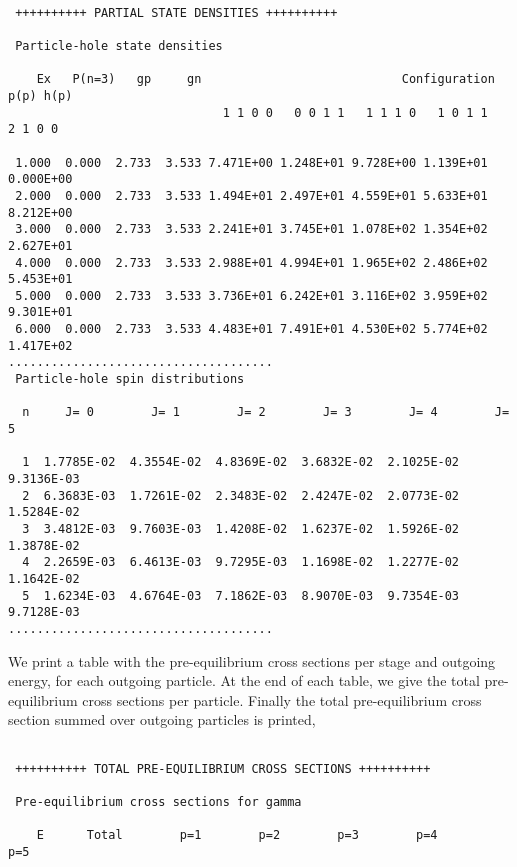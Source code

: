 \begin{samplecase}
{\small \begin{verbatim}

 ++++++++++ PARTIAL STATE DENSITIES ++++++++++

 Particle-hole state densities

    Ex   P(n=3)   gp     gn                            Configuration p(p) h(p) 
                              1 1 0 0   0 0 1 1   1 1 1 0   1 0 1 1   2 1 0 0  

 1.000  0.000  2.733  3.533 7.471E+00 1.248E+01 9.728E+00 1.139E+01 0.000E+00 
 2.000  0.000  2.733  3.533 1.494E+01 2.497E+01 4.559E+01 5.633E+01 8.212E+00 
 3.000  0.000  2.733  3.533 2.241E+01 3.745E+01 1.078E+02 1.354E+02 2.627E+01 
 4.000  0.000  2.733  3.533 2.988E+01 4.994E+01 1.965E+02 2.486E+02 5.453E+01 
 5.000  0.000  2.733  3.533 3.736E+01 6.242E+01 3.116E+02 3.959E+02 9.301E+01 
 6.000  0.000  2.733  3.533 4.483E+01 7.491E+01 4.530E+02 5.774E+02 1.417E+02 
.....................................
 Particle-hole spin distributions

  n     J= 0        J= 1        J= 2        J= 3        J= 4        J= 5       
 
  1  1.7785E-02  4.3554E-02  4.8369E-02  3.6832E-02  2.1025E-02  9.3136E-03  
  2  6.3683E-03  1.7261E-02  2.3483E-02  2.4247E-02  2.0773E-02  1.5284E-02  
  3  3.4812E-03  9.7603E-03  1.4208E-02  1.6237E-02  1.5926E-02  1.3878E-02  
  4  2.2659E-03  6.4613E-03  9.7295E-03  1.1698E-02  1.2277E-02  1.1642E-02  
  5  1.6234E-03  4.6764E-03  7.1862E-03  8.9070E-03  9.7354E-03  9.7128E-03  
.....................................
\end{verbatim} } \renewcommand{\baselinestretch}{1.07}\small\normalsize
\noindent
We print a table with the pre-equilibrium cross sections per stage and outgoing 
energy, for each outgoing particle. At the end of each table, we give the total
pre-equilibrium cross sections per particle. Finally the total pre-equilibrium 
cross section summed over outgoing particles is printed,

{\small \begin{verbatim}

 ++++++++++ TOTAL PRE-EQUILIBRIUM CROSS SECTIONS ++++++++++
  
 Pre-equilibrium cross sections for gamma
  
    E      Total        p=1        p=2        p=3        p=4        p=5        


\end{verbatim}}
\end{samplecase}
